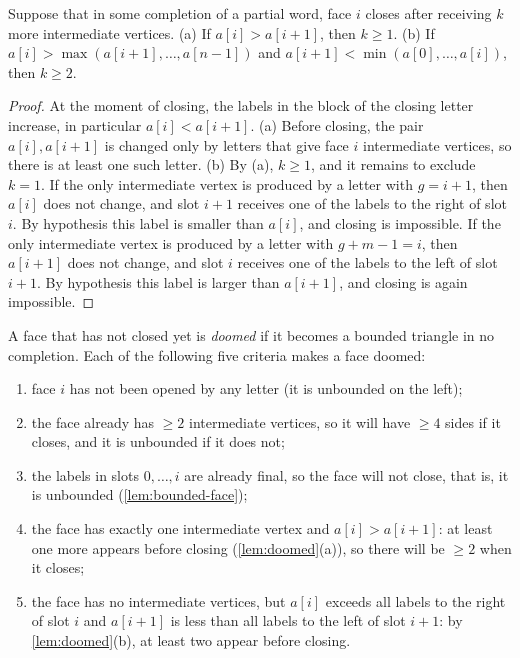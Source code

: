 \begin{lemma}\label{lem:doomed}
Suppose that in some completion of a partial word, face $i$ closes after receiving $k$ more intermediate vertices.
(a) If $a[i]>a[i+1]$, then $k\ge1$.
(b) If $a[i]>\max(a[i+1],\ldots,a[n-1])$ and $a[i+1]<\min(a[0],\ldots,a[i])$, then $k\ge2$.
\end{lemma}

\begin{proof}
At the moment of closing, the labels in the block of the closing letter increase, in particular $a[i]<a[i+1]$.
(a) Before closing, the pair $a[i],a[i+1]$ is changed only by letters that give face $i$ intermediate vertices, so there is at least one such letter.
(b) By (a), $k\ge1$, and it remains to exclude $k=1$.
If the only intermediate vertex is produced by a letter with $g=i+1$, then $a[i]$ does not change, and slot $i+1$ receives one of the labels to the right of slot $i$. By hypothesis this label is smaller than $a[i]$, and closing is impossible.
If the only intermediate vertex is produced by a letter with $g+m-1=i$, then $a[i+1]$ does not change, and slot $i$ receives one of the labels to the left of slot $i+1$. By hypothesis this label is larger than $a[i+1]$, and closing is again impossible.
\end{proof}

A face that has not closed yet is \emph{doomed} if it becomes a bounded triangle in no completion. Each of the following five criteria makes a face doomed:

\begin{enumerate}
\item face $i$ has not been opened by any letter (it is unbounded on the left);
\item the face already has $\ge2$ intermediate vertices, so it will have $\ge4$ sides if it closes, and it is unbounded if it does not;
\item the labels in slots $0,\ldots,i$ are already final, so the face will not close, that is, it is unbounded (\cref{lem:bounded-face});
\item the face has exactly one intermediate vertex and $a[i]>a[i+1]$: at least one more appears before closing (\cref{lem:doomed}(a)), so there will be $\ge2$ when it closes;
\item the face has no intermediate vertices, but $a[i]$ exceeds all labels to the right of slot $i$ and $a[i+1]$ is less than all labels to the left of slot $i+1$: by \cref{lem:doomed}(b), at least two appear before closing.
\end{enumerate}


